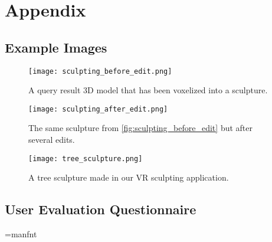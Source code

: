 \chapter{Appendix}

\section{Example Images}

\begin{figure}[!htb]
\texttt{[image: sculpting\_before\_edit.png]}
\caption{A query result 3D model that has been voxelized into a sculpture.}
\label{fig:sculpting_before_edit}
\endminipage\hfill
{}
\texttt{[image: sculpting\_after\_edit.png]}
\caption{The same sculpture from \ref{fig:sculpting_before_edit} but after several edits.}
\label{fig:sculpting_after_edit}
\endminipage\hfill
{}
\texttt{[image: tree\_sculpture.png]}
\caption{A tree sculpture made in our VR sculpting application.}
\label{fig:tree_sculpture}
\endminipage\hfill
\end{figure}

\newpage

\section{User Evaluation Questionnaire}

\ifx\pdfoutput\undefined
\else
    \pdfpagewidth=210mm
    \pdfpageheight=297mm
\fi

\newif\ifbanner\bannerfalse
\bannerfalse
\advance\oddsidemargin-5mm
\advance\textwidth1cm

\font\manual=manfnt
\def\shared{\noindent\llap{\manual\char'170\kern.15em}}

\def\heading#1{
    \ifhmode\par\fi
    \removelastskip
    \vskip1ex plus 0.5ex minus 0.3 ex%
    \noindent
    \hbox to \hsize{ #1\hfill}
    \smallskip\par\nobreak}


\def\nicefrac#1/#2{\leavevmode%
    \raise.5ex\hbox{\the\scriptfont0 #1}%
    \kern-.1em/\kern-.15em%
    \lower.25ex\hbox{\the\scriptfont0 #2}}

\newdimen\scalewidth
{}\hsize 

\def\xboxit#1{\hbox{\lower0.7ex\vbox{\hrule\hbox{\vrule\kern1pt
    \vbox{\kern1pt\hbox{\strut\small #1}\kern1pt}\kern1pt\vrule}\hrule}}}

